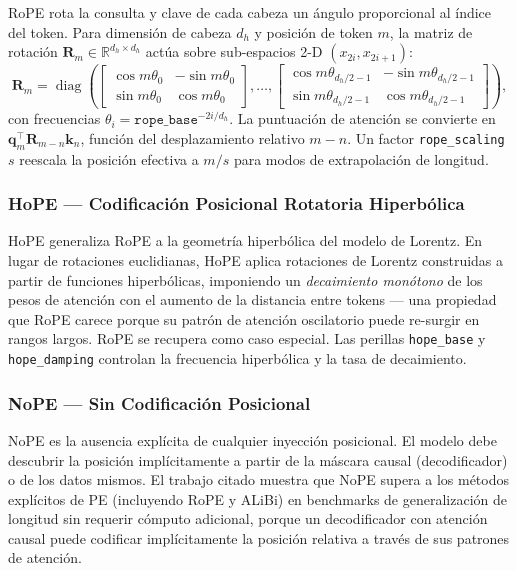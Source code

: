 RoPE \citep{su_rope_2024} rota la consulta y clave de cada cabeza un
ángulo proporcional al índice del token. Para dimensión de cabeza
$d_h$ y posición de token $m$, la matriz de rotación
$\mathbf{R}_m \in \mathbb{R}^{d_h \times d_h}$ actúa sobre sub-espacios
2-D $(x_{2i}, x_{2i+1})$:
\[
\mathbf{R}_m = \operatorname{diag}\!\left(
\begin{bmatrix}\cos m\theta_0 & -\sin m\theta_0 \\ \sin m\theta_0 & \cos m\theta_0\end{bmatrix},
\dots,
\begin{bmatrix}\cos m\theta_{d_h/2-1} & -\sin m\theta_{d_h/2-1} \\ \sin m\theta_{d_h/2-1} & \cos m\theta_{d_h/2-1}\end{bmatrix}
\right),
\]
con frecuencias $\theta_i = \texttt{rope\_base}^{-2i/d_h}$. La puntuación
de atención se convierte en
$\mathbf{q}_m^\top \mathbf{R}_{m-n} \mathbf{k}_n$, función del
desplazamiento relativo $m{-}n$. Un factor \texttt{rope\_scaling} $s$
reescala la posición efectiva a $m/s$ para modos de extrapolación de
longitud.

\subsubsection{HoPE --- Codificación Posicional Rotatoria Hiperbólica}

HoPE \citep{dai_hope_2025} generaliza RoPE a la geometría hiperbólica del
modelo de Lorentz. En lugar de rotaciones euclidianas, HoPE aplica
rotaciones de Lorentz construidas a partir de funciones hiperbólicas,
imponiendo un \emph{decaimiento monótono} de los pesos de atención con
el aumento de la distancia entre tokens --- una propiedad que RoPE carece
porque su patrón de atención oscilatorio puede re-surgir en rangos largos.
RoPE se recupera como caso especial. Las perillas \texttt{hope\_base} y
\texttt{hope\_damping} controlan la frecuencia hiperbólica y la tasa de
decaimiento.

\subsubsection{NoPE --- Sin Codificación Posicional}

NoPE \citep{kazemnejad_nope_2023} es la ausencia explícita de cualquier
inyección posicional. El modelo debe descubrir la posición implícitamente
a partir de la máscara causal (decodificador) o de los datos mismos. El
trabajo citado muestra que NoPE supera a los métodos explícitos de PE
(incluyendo RoPE y ALiBi) en benchmarks de generalización de longitud sin
requerir cómputo adicional, porque un decodificador con atención causal
puede codificar implícitamente la posición relativa a través de sus
patrones de atención.

